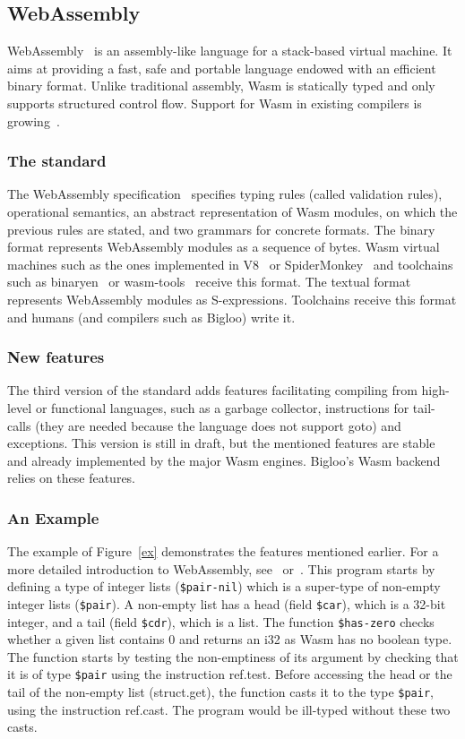\documentclass[a4paper,11pt]{article}
\begin{document}
\subsection{WebAssembly}
WebAssembly~\cite{haas2017bringing} is an assembly-like language for a
stack-based virtual machine. It aims at providing a fast, safe and portable
language endowed with an efficient binary format. Unlike traditional assembly,
Wasm is statically typed and only supports structured control flow. Support for
Wasm in existing compilers is growing~\cite{emscripten, kotlin, ocaml, ruby}.

\subsubsection{The standard}
The WebAssembly specification~\cite{WebAssemblyCoreSpecification3} specifies
typing rules (called validation rules), operational semantics, an abstract
representation of Wasm modules, on which the previous rules are stated, and two
grammars for concrete formats. The binary format represents WebAssembly modules
as a sequence of bytes. Wasm virtual machines such as the ones implemented in
V8~\cite{V8} or SpiderMonkey~\cite{SpiderMonkey} and toolchains such as
binaryen~\cite{Binaryen} or wasm-tools~\cite{WasmTools} receive this format. The
textual format represents WebAssembly modules as S-expressions. Toolchains
receive this format and humans (and compilers such as Bigloo) write it.

\subsubsection{New features}
The third version of the standard adds features facilitating compiling from
high-level or functional languages, such as a garbage collector, instructions
for tail-calls (they are needed because the language does not support goto) and
exceptions. This version is still in draft, but the mentioned features are
stable and already implemented by the major Wasm engines. Bigloo's Wasm backend
relies on these features.

\subsubsection{An Example}
The example of Figure~\ref{ex} demonstrates the features mentioned earlier. For
a more detailed introduction to WebAssembly,
see~\cite[Section~2.1]{phipps2023continuing} or~\cite{haas2017bringing}. This
program starts by defining a type of integer lists (\texttt{\$pair-nil}) which
is a super-type of non-empty integer lists (\texttt{\$pair}). A non-empty list
has a head (field \texttt{\$car}), which is a 32-bit integer, and a tail (field
\texttt{\$cdr}), which is a list. The function \texttt{\$has-zero} checks
whether a given list contains 0 and returns an \textsf{i32} as Wasm has no
boolean type. The function starts by testing the non-emptiness of its argument
by checking that it is of type \texttt{\$pair} using the instruction
\textsf{ref.test}. Before accessing the head or the tail of the non-empty list
(\textsf{struct.get}), the function casts it to the type \texttt{\$pair}, using
the instruction \textsf{ref.cast}. The program would be ill-typed without these
two casts.
\end{document}
